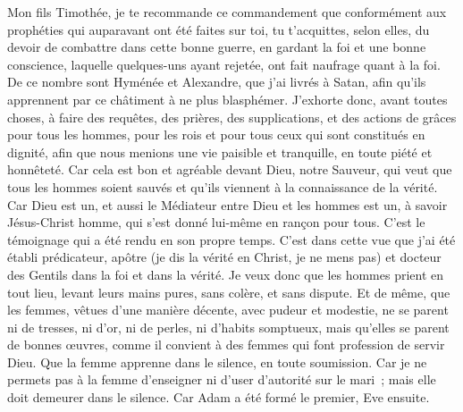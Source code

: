 \begin{multicols}{2}
Mon fils Timothée, je te recommande ce commandement que conformément aux prophéties qui auparavant ont été faites sur toi, tu t'acquittes, selon elles, du devoir de combattre dans cette bonne guerre,
en gardant la foi et une bonne conscience, laquelle quelques-uns ayant rejetée, ont fait naufrage quant à la foi.
De ce nombre sont Hyménée et Alexandre, que j'ai livrés à Satan, afin qu'ils apprennent par ce châtiment à ne plus blasphémer.
\VerseOne{}J'exhorte donc, avant toutes choses, à faire des requêtes, des prières, des supplications, et des actions de grâces pour tous les hommes,
pour les rois et pour tous ceux qui sont constitués en dignité, afin que nous menions une vie paisible et tranquille, en toute piété et honnêteté.
Car cela est bon et agréable devant Dieu, notre Sauveur,
qui veut que tous les hommes soient sauvés et qu'ils viennent à la connaissance de la vérité.
Car Dieu est un, et aussi le Médiateur entre Dieu et les hommes est un, à savoir Jésus-Christ homme,
qui s'est donné lui-même en rançon pour tous. C'est le témoignage qui a été rendu en son propre temps.
C'est dans cette vue que j'ai été établi prédicateur, apôtre (je dis la vérité en Christ, je ne mens pas) et docteur des Gentils dans la foi et dans la vérité.
Je veux donc que les hommes prient en tout lieu, levant leurs mains pures, sans colère, et sans dispute.
Et de même, que les femmes, vêtues d'une manière décente, avec pudeur et modestie, ne se parent ni de tresses, ni d'or, ni de perles, ni d'habits somptueux,
mais qu'elles se parent de bonnes œuvres, comme il convient à des femmes qui font profession de servir Dieu.
Que la femme apprenne dans le silence, en toute soumission.
Car je ne permets pas à la femme d'enseigner ni d'user d'autorité sur le mari~; mais elle doit demeurer dans le silence.
Car Adam a été formé le premier, Eve ensuite.

\end{multicols}
